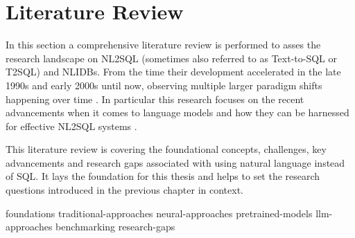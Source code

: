 \section{Literature Review}

%
%
%
%
%
%
%


In this section a comprehensive literature review is performed to asses the research landscape on NL2SQL
(sometimes also referred to as Text-to-SQL or T2SQL) and NLIDBs. From the time their development accelerated in
the late 1990s and early 2000s \citep{NLIDBs, NLIDBTheory, ILPParsing, ILPParsing2} until now, observing multiple 
larger paradigm shifts happening over time \citep{GRAPPA, STRUG, Seq2SQL, NALIR, SQLizer}. In particular this 
research focuses on the recent advancements when it comes to language models and how they can be harnessed for
effective NL2SQL systems \citep{LLM-Sql, DAIL-SQL, T2SQL-LLM-Bench-2, T2SQL-LLM-Bench-3, Spider2, BIRD}.

This literature review is covering the foundational concepts, challenges, key advancements and research gaps
associated with using natural language instead of SQL. It lays the foundation for this thesis and helps to set
the research questions introduced in the previous chapter in context.

{foundations}
{traditional-approaches}
{neural-approaches}
{pretrained-models}
{llm-approaches}
{benchmarking}
{research-gaps}








